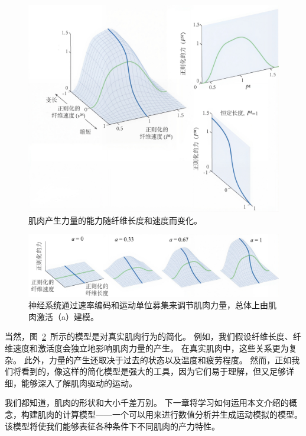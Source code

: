 \begin{figure}[!htb]
	\centering
	\includegraphics[width=1.0\linewidth]{chap4/4_17}
	\caption{肌肉产生力量的能力随纤维长度和速度而变化\cite{lieber2002skeletal}。 \label{fig:4_17}}
\end{figure}


\begin{figure}[!htb]
	\centering
	\includegraphics[width=1.0\linewidth]{chap4/4_18}
	\caption{神经系统通过速率编码和运动单位募集来调节肌肉力量，总体上由肌肉激活（a）建模。 \label{fig:4_18}}
\end{figure}


当然，图~\ref{fig:4_18}~所示的模型是对真实肌肉行为的简化。
例如，我们假设纤维长度、纤维速度和激活度会独立地影响肌肉力量的产生。
在真实肌肉中，这些关系更为复杂。
此外，力量的产生还取决于过去的状态以及温度和疲劳程度。
然而，正如我们将看到的，像这样的简化模型是强大的工具，因为它们易于理解，但又足够详细，能够深入了解肌肉驱动的运动。


我们都知道，肌肉的形状和大小千差万别。
下一章将学习如何运用本文介绍的概念，构建肌肉的计算模型——一个可以用来进行数值分析并生成运动模拟的模型。
该模型将使我们能够表征各种条件下不同肌肉的产力特性。






